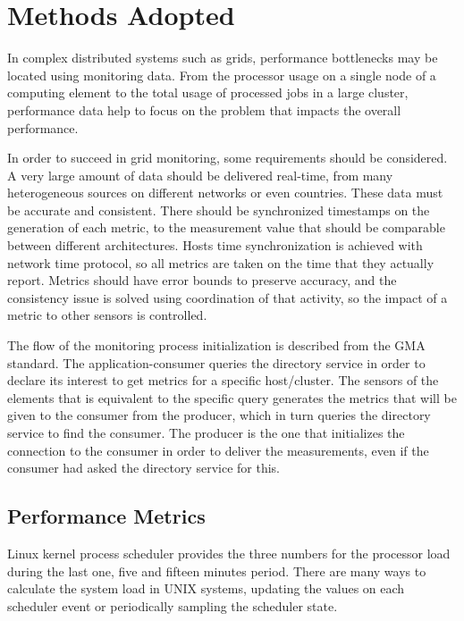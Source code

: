 \section{Methods Adopted}

In complex distributed systems such as grids, performance bottlenecks may be located using monitoring data. From the processor usage on a single node of a computing element to the total usage of processed jobs in a large cluster, performance data help to focus on the problem that impacts the overall performance.

In order to succeed in grid monitoring, some requirements should be considered. A very large amount of data should be delivered real-time, from many heterogeneous sources on different networks or even countries. These data must be accurate and consistent. There should be synchronized timestamps on the generation of each metric, to the measurement value that should be comparable between different architectures. Hosts time synchronization is achieved with network time protocol, so all metrics are taken on the time that they actually report. Metrics should have error bounds to preserve accuracy, and the consistency issue is solved using coordination of that activity, so the impact of a metric to other sensors is controlled.

The flow of the monitoring process initialization is described from the GMA standard. The application-consumer queries the directory service in order to declare its interest to get metrics for a specific host/cluster. The sensors of the elements that is equivalent to the specific query generates the metrics that will be given to the consumer from the producer, which in turn queries the directory service to find the consumer. The producer is the one that initializes the connection to the consumer in order to deliver the measurements, even if the consumer had asked the directory service for this. \cite{balatonuse}

\subsection{Performance Metrics}

Linux kernel process scheduler provides the three numbers for the processor load during the last one, five and fifteen minutes period. There are many ways to calculate the system load in UNIX systems, updating the values on each scheduler event or periodically sampling the scheduler state.

